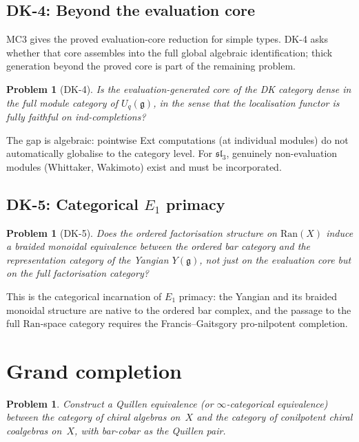 \documentclass[11pt]{amsart}
\newcommand{\Ran}{\mathrm{Ran}}
\newcommand{\g}{\mathfrak{g}}
\newcommand{\fsl}{\mathfrak{sl}}
\theoremstyle{plain}
\newtheorem{problem}[theorem]{Problem}
\theoremstyle{definition}
\theoremstyle{remark}
\begin{document}
\subsection{DK-4: Beyond the evaluation core}

MC3 gives the proved evaluation-core reduction for simple types.
DK-4 asks whether that core assembles into the full global
algebraic identification; thick generation beyond the proved core is
part of the remaining problem.

\begin{problem}[DK-4]
Is the evaluation-generated core of the DK category dense in the
full module category of $U_q(\g)$, in the sense that the
localisation functor is fully faithful on ind-completions?
\end{problem}

The gap is algebraic: pointwise Ext computations (at individual
modules) do not automatically globalise to the category level.
For $\fsl_3$, genuinely non-evaluation modules (Whittaker,
Wakimoto) exist and must be incorporated.

\subsection{DK-5: Categorical $E_1$ primacy}

\begin{problem}[DK-5]
Does the ordered factorisation structure on $\Ran(X)$ induce a
braided monoidal equivalence between the ordered bar category and
the representation category of the Yangian $Y(\g)$, not just on
the evaluation core but on the full factorisation category?
\end{problem}

This is the categorical incarnation of $E_1$ primacy: the
Yangian and its braided monoidal structure are native to the
ordered bar complex, and the passage to the full $\Ran$-space
category requires the Francis--Gaitsgory pro-nilpotent
completion.


\section{Grand completion}

\begin{problem}
Construct a Quillen equivalence (or $\infty$-categorical
equivalence) between the category of chiral algebras on~$X$ and
the category of conilpotent chiral coalgebras on~$X$, with
bar-cobar as the Quillen pair.
\end{problem}
\end{document}
